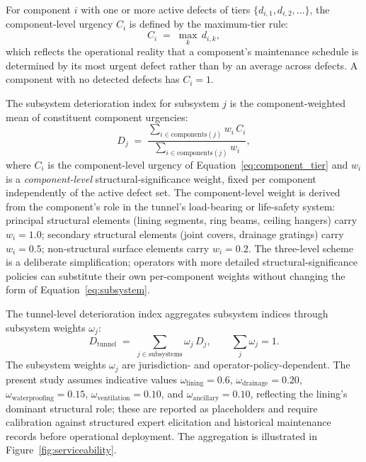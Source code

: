 \documentclass[11pt,a4paper]{article}
\begin{document}
For component $i$ with one or more active defects of tiers $\{d_{i,1}, d_{i,2}, \dots\}$, the component-level urgency $C_i$ is defined by the maximum-tier rule:
\begin{equation}
  C_i \;=\; \max_{k} \, d_{i,k},
  \label{eq:component_tier}
\end{equation}
which reflects the operational reality that a component's maintenance schedule is determined by its most urgent defect rather than by an average across defects. A component with no detected defects has $C_i = 1$.

The subsystem deterioration index for subsystem $j$ is the component-weighted mean of constituent component urgencies:
\begin{equation}
  D_j \;=\; \frac{\sum_{i \in \text{components}(j)} w_i\,C_i}
                  {\sum_{i \in \text{components}(j)} w_i},
  \label{eq:subsystem}
\end{equation}
where $C_i$ is the component-level urgency of Equation~\ref{eq:component_tier} and $w_i$ is a \emph{component-level} structural-significance weight, fixed per component independently of the active defect set. The component-level weight is derived from the component's role in the tunnel's load-bearing or life-safety system: principal structural elements (lining segments, ring beams, ceiling hangers) carry $w_i=1.0$; secondary structural elements (joint covers, drainage gratings) carry $w_i=0.5$; non-structural surface elements carry $w_i=0.2$. The three-level scheme is a deliberate simplification; operators with more detailed structural-significance policies can substitute their own per-component weights without changing the form of Equation~\ref{eq:subsystem}.

The tunnel-level deterioration index aggregates subsystem indices through subsystem weights $\omega_j$:
\begin{equation}
  D_{\text{tunnel}} \;=\; \sum_{j \in \text{subsystems}}
    \omega_j\,D_j ,
  \qquad \sum_j \omega_j = 1.
  \label{eq:tunnel}
\end{equation}
The subsystem weights $\omega_j$ are jurisdiction- and operator-policy-dependent. The present study assumes indicative values $\omega_{\text{lining}}=0.6$, $\omega_{\text{drainage}}=0.20$, $\omega_{\text{waterproofing}}=0.15$, $\omega_{\text{ventilation}}=0.10$, and $\omega_{\text{ancillary}}=0.10$, reflecting the lining's dominant structural role; these are reported as placeholders and require calibration against structured expert elicitation and historical maintenance records before operational deployment. The aggregation is illustrated in Figure~\ref{fig:serviceability}.
\end{document}
